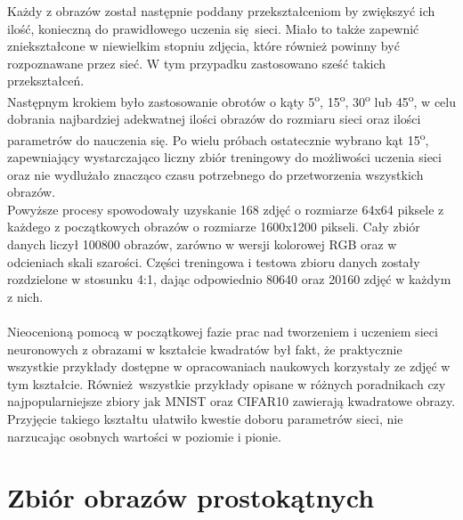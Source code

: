 Każdy z obrazów został następnie poddany przekształceniom by zwiększyć ich ilość, konieczną
do prawidłowego uczenia się sieci. Miało to także zapewnić zniekształcone w niewielkim stopniu
zdjęcia, które również powinny być rozpoznawane przez sieć. W tym przypadku zastosowano sześć
takich przekształceń. \\
Następnym krokiem było zastosowanie obrotów o kąty 5\textsuperscript{o},
15\textsuperscript{o}, 30\textsuperscript{o} lub 45\textsuperscript{o}, w celu dobrania
najbardziej adekwatnej ilości obrazów do rozmiaru sieci oraz ilości parametrów
do nauczenia się. Po wielu próbach ostatecznie wybrano kąt 15\textsuperscript{o}, zapewniający
wystarczająco liczny zbiór treningowy do możliwości uczenia sieci oraz nie
wydlużało znacząco czasu potrzebnego do przetworzenia wszystkich obrazów.\\
Powyższe procesy spowodowały uzyskanie 168 zdjęć o rozmiarze 64x64 piksele z każdego
z początkowych obrazów o rozmiarze 1600x1200 pikseli. Cały zbiór danych liczył 100800
obrazów, zarówno w wersji kolorowej RGB oraz w odcieniach skali szarości. Części
treningowa i testowa zbioru danych zostały rozdzielone w stosunku 4:1, dając odpowiednio
80640 oraz 20160 zdjęć w każdym z nich. \\\\
Nieocenioną pomocą w początkowej fazie prac nad tworzeniem i uczeniem sieci neuronowych
z obrazami w kształcie kwadratów był fakt, że praktycznie wszystkie przykłady dostępne
w opracowaniach naukowych korzystały ze zdjęć w tym kształcie. Również wszystkie
przykłady opisane w różnych poradnikach czy najpopularniejsze zbiory jak MNIST oraz
CIFAR10 zawierają kwadratowe obrazy. Przyjęcie takiego kształtu ułatwiło kwestie
doboru parametrów sieci, nie narzucając osobnych wartości w poziomie i pionie.

 \section{Zbiór obrazów prostokątnych}

